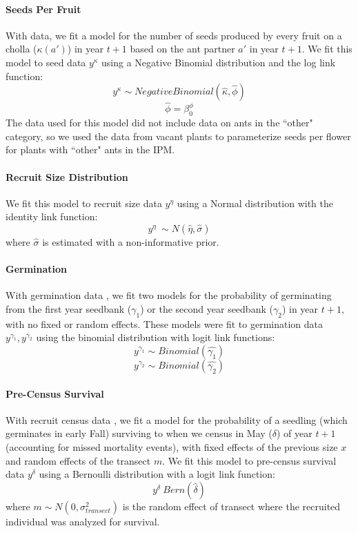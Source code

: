 \documentclass[11pt]{article}
\begin{document}
\paragraph{Seeds Per Fruit}
With data\cite{Miller2006}, we fit a model for the number of seeds produced by every fruit on a cholla ($\kappa(a')$) in year $t+1$ based on the ant partner $a'$ in year $t+1$.
We fit this model to seed data $y^{\kappa}$ using a Negative Binomial distribution and the log link function: 
$$y^{\kappa} \sim  Negative Binomial(\hat{\kappa},\hat{\phi})$$
$$\hat{\phi} = \beta_{0}^{\phi}$$
The data used for this model did not include data on ants in the ``other" category, so we used the data from vacant plants to parameterize seeds per flower for plants with ``other" ants in the IPM.

\paragraph{Recruit Size Distribution}
We fit this model to recruit size data $y^{\eta}$ using a Normal distribution with the identity link function: 
$$y^{\eta} ~\sim N(\hat{\eta},\hat{\sigma})$$
where $\hat{\sigma}$ is estimated with a non-informative prior. 

\paragraph{Germination}
With germination data \cite{Miller2007}, we fit two models for the probability of germinating from the first year seedbank ($\gamma_1$) or the second year seedbank ($\gamma_2$) in year $t+1$, with no fixed or random effects.
These models were fit to germination data $y^{\gamma_1}, y^{\gamma_2}$  using the binomial distribution with logit link functions:
$$y^{\gamma_1} \sim Binomial(\hat{\gamma_1})$$
$$y^{\gamma_2} \sim Binomial(\hat{\gamma_2})$$

\paragraph{Pre-Census Survival}
With recruit census data \cite{Miller2006}, we fit a model for the probability of a seedling (which germinates in early Fall) surviving to when we census in May ($\delta$) of year $t+1$ (accounting for missed mortality events), with fixed effects of the previous size $x$ and random effects of the transect $m$.
We fit this model to pre-census survival data $y^{\delta}$ using a Bernoulli distribution with a logit link function: 
$$y^{\delta} ~ Bern(\hat{\delta})$$
where $m \sim N(0, \sigma_{transect}^2)$ is the random effect of transect where the recruited individual was analyzed for survival.
\end{document}
